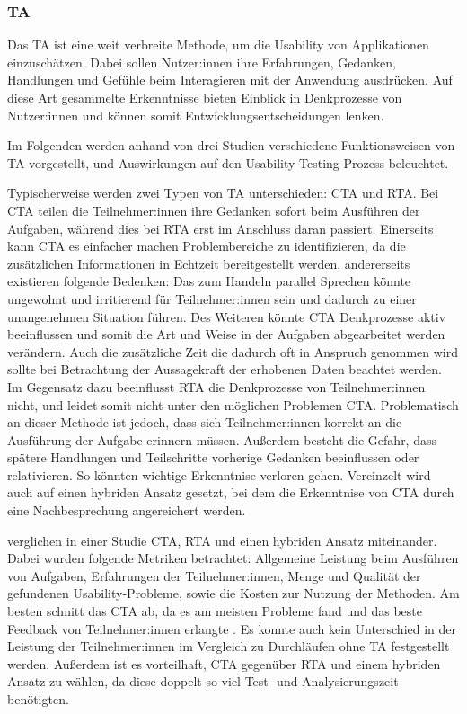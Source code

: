 \parencite{barnumUsabilityTesting2021}

\subsubsection{\acl{TA}}
\label{sec:think-aloud}

Das \ac{TA} ist eine weit verbreite Methode, um die Usability von Applikationen einzuschätzen. Dabei sollen Nutzer:innen ihre Erfahrungen, Gedanken, Handlungen und Gefühle beim Interagieren mit der Anwendung ausdrücken. Auf diese Art gesammelte Erkenntnisse  bieten Einblick in Denkprozesse von Nutzer:innen und können somit Entwicklungsentscheidungen lenken.
\parencite{alhadretiRethinkingThinking2018}

Im Folgenden werden anhand von drei Studien verschiedene Funktionsweisen von \ac{TA} vorgestellt, und Auswirkungen auf den Usability Testing Prozess beleuchtet.

Typischerweise werden zwei Typen von \ac{TA} unterschieden: \ac{CTA} und \ac{RTA}. Bei \ac{CTA} teilen die Teilnehmer:innen ihre Gedanken sofort beim Ausführen der Aufgaben, während dies bei \ac{RTA} erst im Anschluss daran passiert. Einerseits kann \ac{CTA} es einfacher machen Problembereiche zu identifizieren, da die zusätzlichen Informationen in Echtzeit bereitgestellt werden, andererseits existieren folgende Bedenken: Das zum Handeln parallel Sprechen könnte ungewohnt und irritierend für Teilnehmer:innen sein und dadurch zu einer unangenehmen Situation führen. Des Weiteren könnte \ac{CTA} Denkprozesse aktiv beeinflussen und somit die Art und Weise in der Aufgaben abgearbeitet werden verändern. Auch die zusätzliche Zeit die dadurch oft in Anspruch genommen wird sollte bei Betrachtung der Aussagekraft der erhobenen Daten beachtet werden.  Im Gegensatz dazu beeinflusst \ac{RTA} die Denkprozesse von Teilnehmer:innen nicht, und leidet somit nicht unter den möglichen Problemen \ac{CTA}. Problematisch an dieser Methode ist jedoch, dass sich Teilnehmer:innen korrekt an die Ausführung der Aufgabe erinnern müssen. Außerdem besteht die Gefahr, dass spätere Handlungen und Teilschritte vorherige Gedanken beeinflussen oder relativieren. So könnten wichtige Erkenntnise verloren gehen. Vereinzelt wird auch auf einen hybriden Ansatz gesetzt, bei dem die Erkenntnise von \ac{CTA} durch eine Nachbesprechung
angereichert werden. \cite{alhadretiRethinkingThinking2018}

\textcite{alhadretiRethinkingThinking2018} verglichen in einer Studie \ac{CTA}, \ac{RTA} und einen hybriden Ansatz miteinander. Dabei wurden folgende Metriken betrachtet: Allgemeine Leistung beim Ausführen von Aufgaben, Erfahrungen der Teilnehmer:innen, Menge und Qualität der gefundenen Usability-Probleme, sowie die Kosten zur Nutzung der Methoden. Am besten schnitt das \acl{CTA} ab, da es am meisten Probleme fand und das beste Feedback von Teilnehmer:innen erlangte . Es konnte auch kein Unterschied in der Leistung der Teilnehmer:innen im Vergleich zu Durchläufen ohne \ac{TA} festgestellt werden. Außerdem ist es vorteilhaft, \ac{CTA} gegenüber \ac{RTA} und einem hybriden Ansatz zu wählen, da diese doppelt so viel Test- und Analysierungszeit benötigten.
\parencite{alhadretiRethinkingThinking2018}

